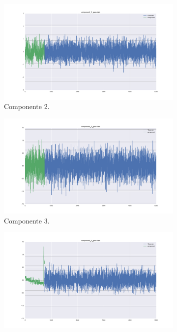 \documentclass[11pt,spanish,listoffigures,listoftables]{tfgetsinf}
\begin{document}
    \begin{figure}[H]
        \centering
        \begin{subfigure}[h]{0.49\textwidth}
            \centering
            \includegraphics[width=\textwidth]{component_2_gaussian.png}
            \caption{Componente 2.}
            \label{fig:component_2_gaussian}
        \end{subfigure}
        \begin{subfigure}[h]{0.49\textwidth}
            \centering
            \includegraphics[width=\textwidth]{component_3_gaussian.png}
            \caption{Componente 3.}
            \label{fig:component_3_gaussian}
        \end{subfigure}
        \begin{subfigure}[h]{0.49\textwidth}
            \centering
            \includegraphics[width=\textwidth]{component_4_gaussian.png}

\end{subfigure}
\end{figure}
\end{document}
